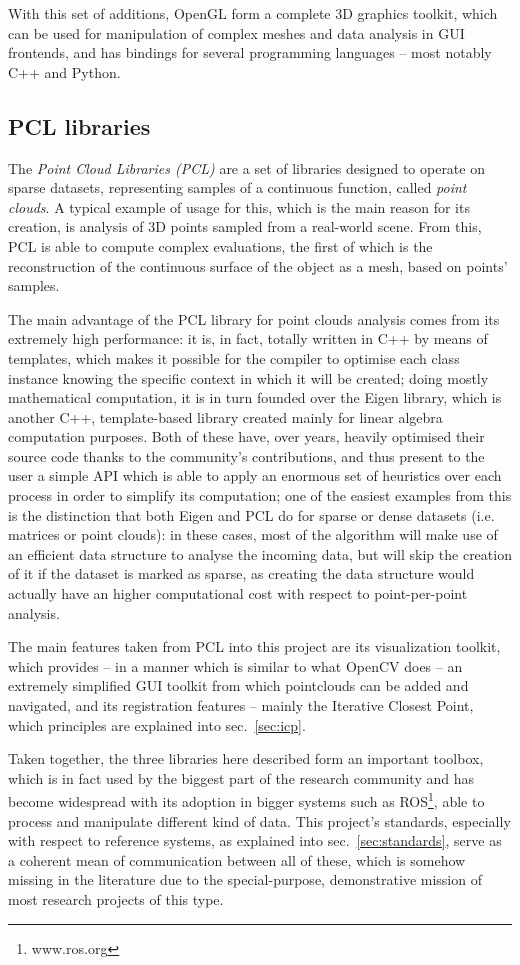 With this set of additions, OpenGL form a complete 3D graphics
toolkit, which can be used for manipulation of complex meshes and data
analysis in GUI frontends, and has bindings for several programming
languages -- most notably C++ and Python.

\subsection{PCL libraries}
The \emph{Point Cloud Libraries (\emph{PCL})} are a set of libraries
designed to operate on sparse datasets, representing samples of a
continuous function, called \emph{point clouds}. A typical example of usage for this, which is the
main reason for its creation, is analysis of 3D points sampled from a
real-world scene. From this, PCL is able to compute complex
evaluations, the first of which is the reconstruction of the continuous
surface of the object as a mesh, based on points' samples.

The main advantage of the PCL library for point clouds analysis comes
from its extremely high performance: it is, in fact, totally written
in C++ by means of templates, which makes it possible for the compiler
to optimise each class instance knowing the specific context in which
it will be created; doing mostly mathematical computation, it is in
turn founded over the Eigen library, which is another C++,
template-based library created mainly for linear algebra computation
purposes. Both of these have, over years, heavily optimised their
source code thanks to the community's contributions, and thus present
to the user a simple API which is able to apply an enormous set of
heuristics over each process in order to simplify its computation; one
of the easiest examples from this is the distinction that both Eigen
and PCL do for sparse or dense datasets (i.e. matrices or point
clouds): in these cases, most of the algorithm will make use of an
efficient data structure to analyse the incoming data, but will skip
the creation of it if the dataset is marked as sparse, as creating the
data structure would actually have an higher computational cost with
respect to point-per-point analysis.

The main features taken from PCL into this project are its
visualization toolkit, which provides -- in a manner which is similar
to what OpenCV does -- an extremely simplified GUI toolkit from which
pointclouds can be added and navigated, and its registration features
-- mainly the Iterative Closest Point, which principles are explained
into sec.~\ref{sec:icp}.

Taken together, the three libraries here described form an important
toolbox, which is in fact used by the biggest part of the research
community and has become widespread with its adoption in bigger
systems such as ROS\footnote{www.ros.org}, able to process and
manipulate different kind of data. This project's standards,
especially with respect to reference systems, as explained
into sec.~\ref{sec:standards}, serve as a coherent mean of
communication between all of these, which is somehow missing in the
literature due to the special-purpose, demonstrative mission of most
research projects of this type.
